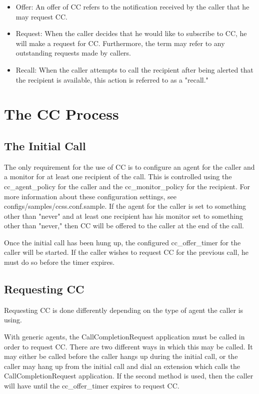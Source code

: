 \begin{itemize}
\item Offer: An offer of CC refers to the notification received by the caller
that he may request CC.

\item Request: When the caller decides that he would like to subscribe to CC,
he will make a request for CC. Furthermore, the term may refer to any
outstanding requests made by callers.

\item Recall: When the caller attempts to call the recipient after being
alerted that the recipient is available, this action is referred to
as a "recall."
\end{itemize}

\section{The CC Process}

\subsection{The Initial Call}

	The only requirement for the use of CC is to configure an agent for
the caller and a monitor for at least one recipient of the call.
This is controlled using the cc\_agent\_policy for the caller and the
cc\_monitor\_policy for the recipient. For more information about these
configuration settings, see configs/samples/ccss.conf.sample. If the
agent for the caller is set to something other than "never" and at
least one recipient has his monitor set to something other than
"never," then CC will be offered to the caller at the end of the
call.

	Once the initial call has been hung up, the configured
cc\_offer\_timer for the caller will be started. If the caller wishes to
request CC for the previous call, he must do so before the timer
expires.

\subsection{Requesting CC}

	Requesting CC is done differently depending on the type of agent
the caller is using.

	With generic agents, the CallCompletionRequest application must be
called in order to request CC. There are two different ways in which
this may be called. It may either be called before the caller hangs up
during the initial call, or the caller may hang up from the initial
call and dial an extension which calls the CallCompletionRequest
application. If the second method is used, then the caller will
have until the cc\_offer\_timer expires to request CC.

